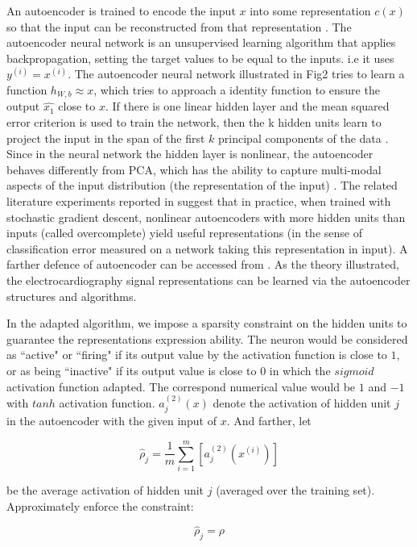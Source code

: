 \documentclass[journal]{IEEEtran}
\begin{document}
An autoencoder is trained to encode the input $x$ into some representation $c(x)$ so that the input can be reconstructed from that representation \cite{bengio2009}. 
The autoencoder neural network is an unsupervised learning algorithm that applies backpropagation, setting the target values to be equal to the inputs. i.e it uses $y^{(i)}=x^{(i)}$. The autoencoder neural network illustrated in Fig2 tries to learn a function $h_{W,b}{\approx}x$, which tries to approach a identity function to ensure the output $\hat{x_1}$ close to $x$. If there is one linear hidden layer and the mean squared error criterion is used to train the network, then the k hidden units learn to project the input in the span of the first $k$ principal components of the data \cite{bourlard}. Since in the neural network the hidden layer is nonlinear, the autoencoder behaves differently from PCA, which has the ability to capture multi-modal aspects of the input distribution (the representation of the input) \cite{jap}. The related literature experiments reported in \cite{bengio2007} suggest that in practice, when trained with stochastic gradient descent, nonlinear autoencoders with more hidden units than inputs (called overcomplete) yield useful representations (in the sense of classification error measured on a network taking this representation in input). A farther defence of autoencoder can be accessed from \cite{bengio2009}.
As the theory illustrated, the electrocardiography signal representations can be learned via the autoencoder structures and algorithms. 

In the adapted algorithm, we impose a sparsity constraint on the hidden units to guarantee the representations expression ability.
The neuron would be considered as ``active" or ``firing" if its output value by the activation function is close to $1$, or as being ``inactive" if its output value is close to $0$ in which the $sigmoid$ activation function adapted. The correspond numerical value would be $1$ and $-1$ with $tanh$ activation function. $a_j^{(2)}(x)$ denote the activation of hidden unit $j$ in the autoencoder with the given input of $x$. 
And farther, let 

\begin{equation}
\hat{\rho}_j = \frac{1}{m} \sum_{i=1}^m [{a_j^{(2)}}{(x^{(i)})}]
\end{equation}

\noindent be the average activation of hidden unit $j$ (averaged over the training set). Approximately enforce the constraint:

\begin{equation}
\hat{\rho}_j = \rho
\end{equation}
\end{document}

